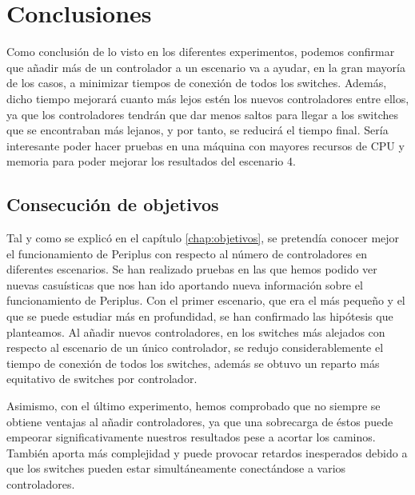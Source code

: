 \documentclass[a4paper, 12pt]{book}
\begin{document}
	
	
	\clearpage
	\chapter{Conclusiones}
	\label{chap:conclusiones}
	
	Como conclusión de lo visto en los diferentes experimentos, podemos confirmar que añadir más de un controlador a un escenario va a ayudar, en la gran mayoría de los casos, a minimizar tiempos de conexión de todos los switches. Además, dicho tiempo mejorará cuanto más lejos estén los nuevos controladores entre ellos, ya que los controladores tendrán que dar menos saltos para llegar a los switches que se encontraban más lejanos, y por tanto, se reducirá el tiempo final.  Sería interesante poder hacer pruebas en una máquina con mayores recursos de CPU y memoria para poder mejorar los resultados del escenario 4.
	
	\section{Consecución de objetivos}
	\label{sec:consecucion-objetivos}
	
	Tal y como se explicó en el capítulo \ref{chap:objetivos}, se pretendía conocer mejor el funcionamiento de Periplus con respecto al número de controladores en diferentes escenarios. Se han realizado pruebas en las que hemos podido ver nuevas casuísticas que nos han ido aportando nueva información sobre el funcionamiento de Periplus. Con el primer escenario, que era el más pequeño y el que se puede estudiar más en profundidad, se han confirmado las hipótesis que planteamos. Al añadir nuevos controladores, en los switches más alejados con respecto al escenario de un único controlador, se redujo considerablemente el tiempo de conexión de todos los switches, además se obtuvo un reparto más equitativo de switches por controlador.
	
	Asimismo, con el último experimento, hemos comprobado que no siempre se obtiene ventajas al añadir controladores, ya que una sobrecarga de éstos puede empeorar significativamente nuestros resultados pese a acortar los caminos. También aporta más complejidad y puede provocar retardos inesperados debido a que los switches pueden estar simultáneamente conectándose a varios controladores.
	
\end{document}
